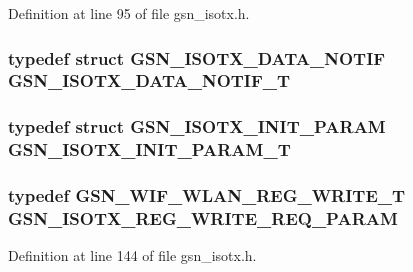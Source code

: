 Definition at line 95 of file gsn\_\-isotx.h.

\hypertarget{a00520_a54682365586a2d8a710c34eb46a2cdef}{
\subsubsection[{GSN\_\-ISOTX\_\-DATA\_\-NOTIF\_\-T}]{\setlength{\rightskip}{0pt plus 5cm}typedef struct {\bf GSN\_\-ISOTX\_\-DATA\_\-NOTIF} {\bf GSN\_\-ISOTX\_\-DATA\_\-NOTIF\_\-T}}}
\label{a00520_a54682365586a2d8a710c34eb46a2cdef}
\hypertarget{a00520_af2ad415cfc6e0a9f2f0011a787436ead}{
\subsubsection[{GSN\_\-ISOTX\_\-INIT\_\-PARAM\_\-T}]{\setlength{\rightskip}{0pt plus 5cm}typedef struct {\bf GSN\_\-ISOTX\_\-INIT\_\-PARAM} {\bf GSN\_\-ISOTX\_\-INIT\_\-PARAM\_\-T}}}
\label{a00520_af2ad415cfc6e0a9f2f0011a787436ead}
\hypertarget{a00520_acc2251c5b5d00db42ec7e821e9707f60}{
\subsubsection[{GSN\_\-ISOTX\_\-REG\_\-WRITE\_\-REQ\_\-PARAM}]{\setlength{\rightskip}{0pt plus 5cm}typedef {\bf GSN\_\-WIF\_\-WLAN\_\-REG\_\-WRITE\_\-T} {\bf GSN\_\-ISOTX\_\-REG\_\-WRITE\_\-REQ\_\-PARAM}}}
\label{a00520_acc2251c5b5d00db42ec7e821e9707f60}


Definition at line 144 of file gsn\_\-isotx.h.

